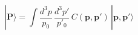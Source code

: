 \begin{equation}
|{\mathbf{P}}\rangle = \int \frac{d^3p}{p_0}\, \frac{d^3p'}{p'_0}\, 
C(\mathbf{p,p'})\, |\mathbf{ p, p'} \rangle   \label{3-1}
\end{equation} 
